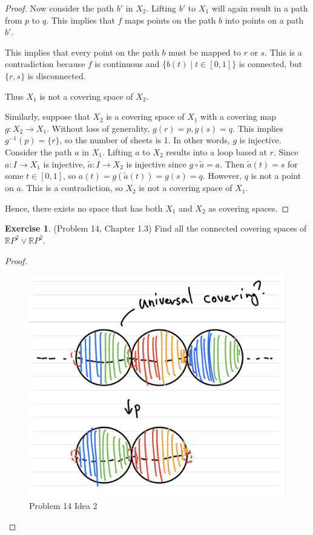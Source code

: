 \documentclass[12pt, psamsfonts]{amsart}
\theoremstyle{definition}
\newtheorem*{exer}{Exercise}
\theoremstyle{remark}
\numberwithin{equation}{section}
\begin{document}
\begin{proof}
  Now consider the path $b'$ in $X_2$.
  Lifting $b'$ to $X_1$ will again result in a path from $p$ to $q$.
  This implies that $f$ maps points on the path $b$ into points on a path $b'$.

  This implies that every point on the path $b$ must be mapped to $r$ or $s$.
  This is a contradiction because $f$ is continuous and $\{ b(t) \mid t \in [0, 1] \}$ is connected, but $\{ r, s \}$ is disconnected.

  Thus $X_1$ is not a covering space of $X_2$.

  Similarly, suppose that $X_2$ is a covering space of $X_1$ with a covering map $g: X_2 \rightarrow X_1$.
  Without loss of generality, $g(r) = p, g(s) = q$.
  This implies $g^{-1}(p) = \{ r \}$, so the number of sheets is 1.
  In other words, $g$ is injective.
  Consider the path $a$ in $X_1$.
  Lifting $a$ to $X_2$ results into a loop based at $r$.
  Since $a: I \rightarrow X_1$ is injective, $\tilde{a}: I \rightarrow X_2$ is injective since $g \circ \tilde{a} = a$.
  Then $\tilde{a}(t) = s$ for some $t \in [0, 1]$, so $a(t) = g(\tilde{a}(t)) = g(s) = q$.
  However, $q$ is not a point on $a$.
  This is a contradiction, so $X_2$ is not a covering space of $X_1$.

  Hence, there exists no space that has both $X_1$ and $X_2$ as covering spaces.
\end{proof}

\begin{exer}{(Problem 14, Chapter 1.3)}
  Find all the connected covering spaces of $\mathbb{R}P^2 \vee \mathbb{R}P^2$.
\end{exer}

\begin{proof}
  \begin{figure}
    \includegraphics[width=.5\linewidth]{problem14_idea_2.jpeg}
    \caption{Problem 14 Idea 2}
    \label{fig:problem14_idea_2}
  \end{figure}
\end{proof}
\end{document}

